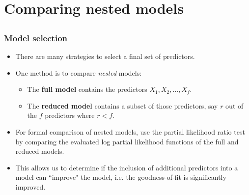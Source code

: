 \section[Nested models]{Comparing nested models}
\subsection{}
\begin{frame}
\end{frame}

\begin{frame}
\frametitle{Model selection}
\begin{itemize}
\item There are many strategies to select a final set of predictors.
\item One method is to compare \emph{nested} models:
\begin{itemize}
\item The \textbf{full model} contains the predictors $X_1,X_2,\ldots,X_f$.
\item The \textbf{reduced model} contains a subset of those predictors, say $r$ out of the $f$ predictors where $r < f$.
\end{itemize}
\item For formal comparison of nested models, use the partial likelihood ratio test by comparing the evaluated log partial likelihood functions of the full and reduced models.
\item This allows us to determine if the inclusion of additional predictors into a model can ``improve" the model, i.e. the goodness-of-fit is significantly improved.
\end{itemize}
\end{frame}

